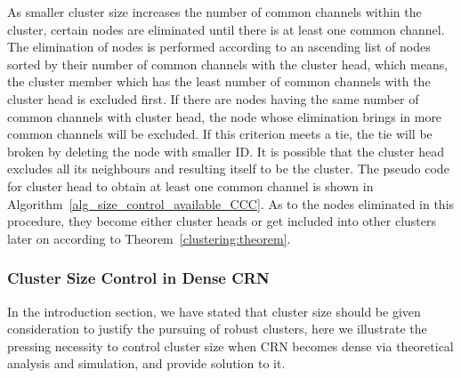 \documentclass[journal,comsoc]{IEEEtran}
\theoremstyle{mytheoremstyle}
\theoremstyle{mytheoremstyle}
\theoremstyle{mytheoremstyle}
\begin{document}
As smaller cluster size increases the number of common channels within the cluster, certain nodes are eliminated until there is at least one common channel.
The elimination of nodes is performed according to an ascending list of nodes sorted by their number of common channels with the cluster head, which means, the cluster member which has the least number of common channels with the cluster head is excluded first.
If there are nodes having the same number of common channels with cluster head, the node whose elimination brings in more common channels will be excluded.
If this criterion meets a tie, the tie will be broken by deleting the node with smaller ID.
It is possible that the cluster head excludes all its neighbours and resulting itself to be the cluster.
The pseudo code for cluster head to obtain at least one common channel is shown in Algorithm~\ref{alg_size_control_available_CCC}.
As to the nodes eliminated in this procedure, they become either cluster heads or get included into other clusters later on according to Theorem~\ref{clustering:theorem}.




\subsubsection{Cluster Size Control in Dense CRN}
\label{cluster_pruning}

In the introduction section, we have stated that cluster size should be given consideration to justify the pursuing of robust clusters, here we illustrate the pressing necessity to control cluster size when CRN becomes dense via theoretical analysis and simulation, and provide solution to it.
\end{document}
